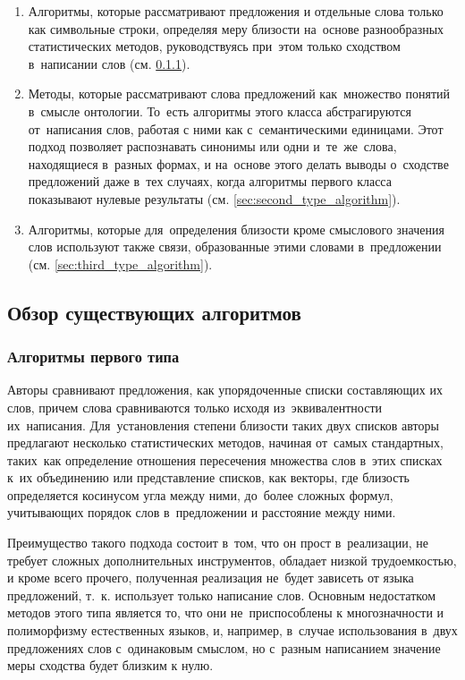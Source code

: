\begin{enumerate}

\item{
Алгоритмы, которые рассматривают предложения и отдельные слова только как символьные строки, 
определяя меру близости на~основе разнообразных статистических методов, 
руководствуясь при~этом только сходством в~написании слов (см. \ref{sec:first_type_algorithm}).
}

\item {
Методы, которые рассматривают слова предложений как~множество понятий в~смысле онтологии.
То~есть алгоритмы этого класса абстрагируются от~написания слов, работая с ними
как с~семантическими единицами\cite{wordnetSim}. 
Этот подход позволяет распознавать синонимы или одни и~те~же~слова, находящиеся в~разных формах,
и на~основе этого делать выводы о~сходстве предложений даже в~тех случаях,
когда алгоритмы первого класса показывают нулевые результаты (см. \ref{sec:second_type_algorithm}).
}

\item {
Алгоритмы, которые  для~определения близости  кроме смыслового значения слов
используют также связи, образованные этими словами в~предложении (см. \ref{sec:third_type_algorithm}).

}
\end{enumerate}

\subsection{Обзор существующих алгоритмов}
\subsubsection{Алгоритмы первого типа}
\label{sec:first_type_algorithm}

Авторы \cite{statisticalSim} сравнивают предложения, 
как упорядоченные списки составляющих их слов, 
причем слова сравниваются только исходя из~эквивалентности их~написания. 
Для~установления степени близости таких двух списков авторы предлагают несколько статистических методов,
начиная от~самых стандартных, таких~как определение отношения пересечения множества слов в~этих списках к~их объединению
или представление списков, как векторы, где близость определяется косинусом угла между ними,
до~более сложных формул, учитывающих порядок слов в~предложении и расстояние между ними.

Преимущество такого подхода состоит в~том, что он прост в~реализации, не требует
сложных дополнительных инструментов, обладает низкой трудоемкостью, и кроме всего прочего,
 полученная реализация не~будет зависеть от языка предложений, 
т.~к. использует только написание слов.
Основным недостатком методов этого типа является то, что они  не~приспособлены к многозначности и полиморфизму естественных языков, 
и, например, в~случае  использования в~двух предложениях слов с~одинаковым смыслом, но с~разным написанием 
значение меры сходства будет близким к нулю.

